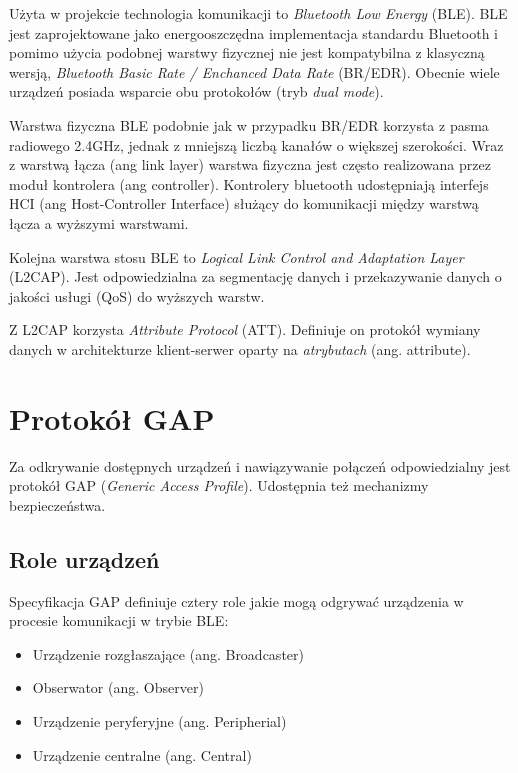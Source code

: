 Użyta w projekcie technologia komunikacji to \emph{Bluetooth Low Energy} (BLE).
BLE jest zaprojektowane jako energooszczędna implementacja standardu Bluetooth
i pomimo użycia podobnej warstwy fizycznej nie jest kompatybilna z klasyczną
wersją, \emph{Bluetooth Basic Rate / Enchanced Data Rate} (BR/EDR). Obecnie
wiele urządzeń posiada wsparcie obu protokołów (tryb \emph{dual mode}).

Warstwa fizyczna BLE podobnie jak w przypadku BR/EDR korzysta z pasma radiowego
2.4GHz, jednak z mniejszą liczbą kanałów o większej szerokości. Wraz z warstwą
łącza (ang link layer) warstwa fizyczna jest często realizowana przez moduł
kontrolera (ang controller). Kontrolery bluetooth udostępniają interfejs HCI
(ang Host-Controller Interface) służący do komunikacji między warstwą łącza
a wyższymi warstwami. 

Kolejna warstwa stosu BLE to \emph{Logical Link Control and Adaptation Layer}
(L2CAP). Jest odpowiedzialna za segmentację danych i przekazywanie danych
o jakości usługi (QoS) do wyższych warstw.

Z L2CAP korzysta \emph{Attribute Protocol} (ATT). Definiuje on protokół wymiany
danych w architekturze klient-serwer oparty na \emph{atrybutach} (ang.
attribute).

\section{Protokół GAP}

Za odkrywanie dostępnych urządzeń i nawiązywanie połączeń odpowiedzialny jest
protokół GAP (\emph{Generic Access Profile}). Udostępnia też mechanizmy
bezpieczeństwa.

\subsection{Role urządzeń}

Specyfikacja GAP definiuje cztery role jakie mogą odgrywać urządzenia w procesie
komunikacji w trybie BLE:

\begin{itemize}

\item Urządzenie rozgłaszające (ang. Broadcaster)

\item Obserwator (ang. Observer)

\item Urządzenie peryferyjne (ang. Peripherial)

\item Urządzenie centralne (ang. Central)

\end{itemize}

